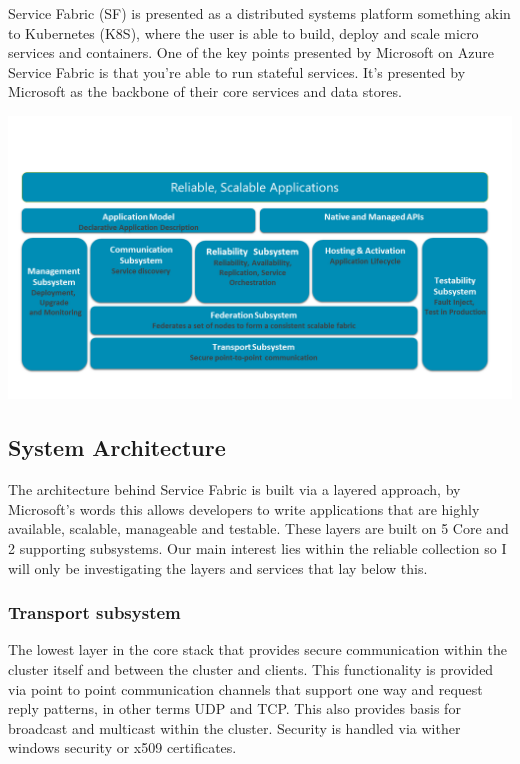 \documentclass[a4paper,10pt,titlepage]{report}
\begin{document}
    Service Fabric (SF) is presented as a distributed systems platform something akin to Kubernetes (K8S), where the user is able to build, deploy and scale micro services and containers. One of the key points presented by Microsoft on Azure Service Fabric is that you're able to run stateful services. It's presented by Microsoft as the backbone of their core services and data stores.\\
    \vspace{5mm}

    \includegraphics[scale=0.5]{images/service-fabric-architecture.png}

    \subsection{System Architecture}

    The architecture behind Service Fabric is built via a layered approach, by Microsoft's words this allows developers to write applications that are highly available, scalable, manageable and testable. These layers are built on 5 Core and 2 supporting subsystems. Our main interest lies within the reliable collection so I will only be investigating the layers and services that lay below this.\\
    \vspace{5mm}

    \subsubsection{Transport subsystem}
    The lowest layer in the core stack that provides secure communication within the cluster itself and between the cluster and clients. This functionality is provided via point to point communication channels that support one way and request reply patterns, in other terms UDP and TCP. This also provides basis for broadcast and multicast within the cluster. Security is handled via wither windows security or x509 certificates. \\
    \vspace{5mm}
\end{document}
